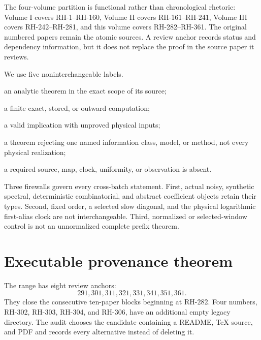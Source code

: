 \documentclass[11pt]{article}
\theoremstyle{definition}
\theoremstyle{remark}
\begin{document}
The four-volume partition is functional rather than chronological rhetoric:
Volume I covers RH-1--RH-160, Volume II covers RH-161--RH-241, Volume III
covers RH-242--RH-281, and this volume covers RH-282--RH-361.  The original
numbered papers remain the atomic sources.  A review anchor records status
and dependency information, but it does not replace the proof in the source
paper it reviews.

We use five noninterchangeable labels.
\begin{description}[leftmargin=3.4cm,style=nextline,font=\normalfont]
\item[\textsc{proved}] an analytic theorem in the exact scope of its source;
\item[\textsc{certified}] a finite exact, stored, or outward computation;
\item[\textsc{conditional}] a valid implication with unproved physical inputs;
\item[\textsc{scoped negative}] a theorem rejecting one named information
class, model, or method, not every physical realization;
\item[\textsc{open/not testable}] a required source, map, clock, uniformity,
or observation is absent.
\end{description}

Three firewalls govern every cross-batch statement.  First, actual noisy,
synthetic spectral, deterministic combinatorial, and abstract coefficient
objects retain their types.  Second, fixed order, a selected slow diagonal,
and the physical logarithmic first-alias clock are not interchangeable.
Third, normalized or selected-window control is not an unnormalized complete
prefix theorem.

\section{Executable provenance theorem}

The range has eight review anchors:
\[
291,301,311,321,331,341,351,361.
\]
They close the consecutive ten-paper blocks beginning at RH-282.  Four
numbers, RH-302, RH-303, RH-304, and RH-306, have an additional empty legacy
directory.  The audit chooses the candidate containing a README, TeX source,
and PDF and records every alternative instead of deleting it.
\end{document}
